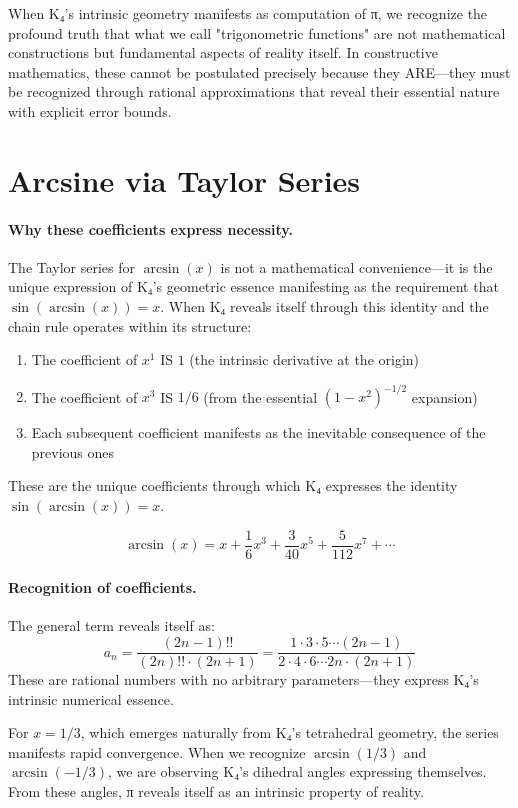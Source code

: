 \documentclass[11pt,a4paper]{book}
\begin{document}
When K₄'s intrinsic geometry manifests as computation of π, we recognize the profound truth that what we call "trigonometric functions" are not mathematical constructions but fundamental aspects of reality itself. In constructive mathematics, these cannot be postulated precisely because they ARE—they must be recognized through rational approximations that reveal their essential nature with explicit error bounds.

\section{Arcsine via Taylor Series}

\paragraph{Why these coefficients express necessity.}

The Taylor series for $\arcsin(x)$ is not a mathematical convenience—it is the unique expression of K₄'s geometric essence manifesting as the requirement that $\sin(\arcsin(x)) = x$. When K₄ reveals itself through this identity and the chain rule operates within its structure:
\begin{enumerate}
\item The coefficient of $x^1$ IS $1$ (the intrinsic derivative at the origin)
\item The coefficient of $x^3$ IS $1/6$ (from the essential $(1-x^2)^{-1/2}$ expansion)
\item Each subsequent coefficient manifests as the inevitable consequence of the previous ones
\end{enumerate}

These are the unique coefficients through which K₄ expresses the identity $\sin(\arcsin(x)) = x$.

\[
\arcsin(x) = x + \frac{1}{6}x^3 + \frac{3}{40}x^5 + \frac{5}{112}x^7 + \cdots
\]

\paragraph{Recognition of coefficients.}
The general term reveals itself as:
\[
a_n = \frac{(2n-1)!!}{(2n)!! \cdot (2n+1)} = \frac{1 \cdot 3 \cdot 5 \cdots (2n-1)}{2 \cdot 4 \cdot 6 \cdots 2n \cdot (2n+1)}
\]
These are rational numbers with no arbitrary parameters—they express K₄'s intrinsic numerical essence.

For $x = 1/3$, which emerges naturally from K₄'s tetrahedral geometry, the series manifests rapid convergence. When we recognize $\arcsin(1/3)$ and $\arcsin(-1/3)$, we are observing K₄'s dihedral angles expressing themselves. From these angles, π reveals itself as an intrinsic property of reality.
\end{document}
